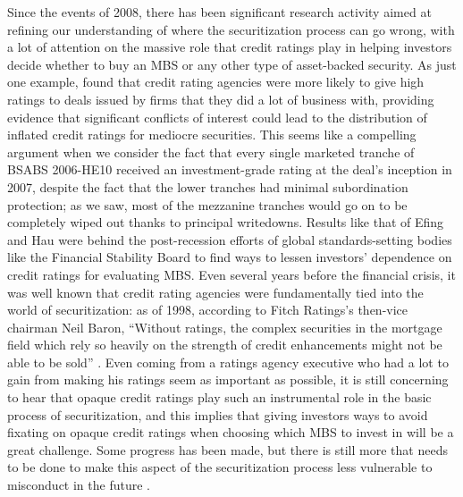 \documentclass[12pt]{article}
\begin{document}
Since the events of 2008, there has been significant research activity aimed at refining our understanding of where the securitization process can go wrong, with a lot of attention on the massive role that credit ratings play in helping investors decide whether to buy an MBS or any other type of asset-backed security. As just one example, \textcite{efing14} found that credit rating agencies were more likely to give high ratings to deals issued by firms that they did a lot of business with, providing evidence that significant conflicts of interest could lead to the distribution of inflated credit ratings for mediocre securities. This seems like a compelling argument when we consider the fact that every single marketed tranche of BSABS 2006-HE10 received an investment-grade rating at the deal’s inception in 2007, despite the fact that the lower tranches had minimal subordination protection; as we saw, most of the mezzanine tranches would go on to be completely wiped out thanks to principal writedowns. Results like that of Efing and Hau were behind the post-recession efforts of global standards-setting bodies like the Financial Stability Board to find ways to lessen investors’ dependence on credit ratings for evaluating MBS. Even several years before the financial crisis, it was well known that credit rating agencies were fundamentally tied into the world of securitization: as of 1998, according to Fitch Ratings’s then-vice chairman Neil Baron, “Without ratings, the complex securities in the mortgage field which rely so heavily on the strength of credit enhancements might not be able to be sold” \parencite{baron98}. Even coming from a ratings agency executive who had a lot to gain from making his ratings seem as important as possible, it is still concerning to hear that opaque credit ratings play such an instrumental role in the basic process of securitization, and this implies that giving investors ways to avoid fixating on opaque credit ratings when choosing which MBS to invest in will be a great challenge. Some progress has been made, but there is still more that needs to be done to make this aspect of the securitization process less vulnerable to misconduct in the future \parencite{scheicher17}.
\end{document}
